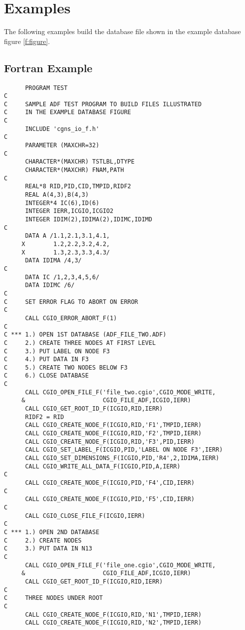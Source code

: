 \section{Examples}
\label{s:examples}

The following examples build the database file shown in the
example database figure \autoref{f:figure}.

\subsection{Fortran Example} \label{s:Fortran}

\begin{verbatim}
      PROGRAM TEST
C
C     SAMPLE ADF TEST PROGRAM TO BUILD FILES ILLUSTRATED
C     IN THE EXAMPLE DATABASE FIGURE
C
      INCLUDE 'cgns_io_f.h'
C
      PARAMETER (MAXCHR=32)
C
      CHARACTER*(MAXCHR) TSTLBL,DTYPE
      CHARACTER*(MAXCHR) FNAM,PATH
C
      REAL*8 RID,PID,CID,TMPID,RIDF2
      REAL A(4,3),B(4,3)
      INTEGER*4 IC(6),ID(6)
      INTEGER IERR,ICGIO,ICGIO2
      INTEGER IDIM(2),IDIMA(2),IDIMC,IDIMD
C
      DATA A /1.1,2.1,3.1,4.1,
     X        1.2,2.2,3.2,4.2,
     X        1.3,2.3,3.3,4.3/
      DATA IDIMA /4,3/
C
      DATA IC /1,2,3,4,5,6/
      DATA IDIMC /6/
C
C     SET ERROR FLAG TO ABORT ON ERROR
C
      CALL CGIO_ERROR_ABORT_F(1)
C
C *** 1.) OPEN 1ST DATABASE (ADF_FILE_TWO.ADF)
C     2.) CREATE THREE NODES AT FIRST LEVEL
C     3.) PUT LABEL ON NODE F3
C     4.) PUT DATA IN F3
C     5.) CREATE TWO NODES BELOW F3
C     6.) CLOSE DATABASE
C
      CALL CGIO_OPEN_FILE_F('file_two.cgio',CGIO_MODE_WRITE,
     &                      CGIO_FILE_ADF,ICGIO,IERR)
      CALL CGIO_GET_ROOT_ID_F(ICGIO,RID,IERR)
      RIDF2 = RID
      CALL CGIO_CREATE_NODE_F(ICGIO,RID,'F1',TMPID,IERR)
      CALL CGIO_CREATE_NODE_F(ICGIO,RID,'F2',TMPID,IERR)
      CALL CGIO_CREATE_NODE_F(ICGIO,RID,'F3',PID,IERR)
      CALL CGIO_SET_LABEL_F(ICGIO,PID,'LABEL ON NODE F3',IERR)
      CALL CGIO_SET_DIMENSIONS_F(ICGIO,PID,'R4',2,IDIMA,IERR)
      CALL CGIO_WRITE_ALL_DATA_F(ICGIO,PID,A,IERR)
C
      CALL CGIO_CREATE_NODE_F(ICGIO,PID,'F4',CID,IERR)
C
      CALL CGIO_CREATE_NODE_F(ICGIO,PID,'F5',CID,IERR)
C
      CALL CGIO_CLOSE_FILE_F(ICGIO,IERR)
C
C *** 1.) OPEN 2ND DATABASE
C     2.) CREATE NODES
C     3.) PUT DATA IN N13
C
      CALL CGIO_OPEN_FILE_F('file_one.cgio',CGIO_MODE_WRITE,
     &                      CGIO_FILE_ADF,ICGIO,IERR)
      CALL CGIO_GET_ROOT_ID_F(ICGIO,RID,IERR)
C
C     THREE NODES UNDER ROOT
C
      CALL CGIO_CREATE_NODE_F(ICGIO,RID,'N1',TMPID,IERR)
      CALL CGIO_CREATE_NODE_F(ICGIO,RID,'N2',TMPID,IERR)

\end{verbatim}

